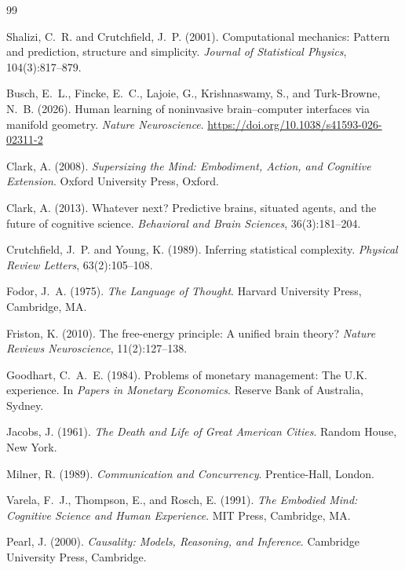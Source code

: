 \documentclass[12pt, a4paper]{article}
\theoremstyle{plain}
\theoremstyle{definition}
\theoremstyle{remark}
\begin{document}
\newpage

\begin{thebibliography}{99}

Shalizi, C.~R. and Crutchfield, J.~P. (2001). Computational mechanics:
Pattern and prediction, structure and simplicity. \textit{Journal of
Statistical Physics}, 104(3):817--879.

Busch, E.~L., Fincke, E.~C., Lajoie, G., Krishnaswamy, S., and
Turk-Browne, N.~B. (2026). Human learning of noninvasive brain--computer
interfaces via manifold geometry. \textit{Nature Neuroscience}.
\url{https://doi.org/10.1038/s41593-026-02311-2}

Clark, A. (2008). \textit{Supersizing the Mind: Embodiment, Action, and
Cognitive Extension}. Oxford University Press, Oxford.

Clark, A. (2013). Whatever next? Predictive brains, situated agents, and
the future of cognitive science. \textit{Behavioral and Brain Sciences},
36(3):181--204.

Crutchfield, J.~P. and Young, K. (1989). Inferring statistical complexity.
\textit{Physical Review Letters}, 63(2):105--108.

Fodor, J.~A. (1975). \textit{The Language of Thought}. Harvard University
Press, Cambridge, MA.

Friston, K. (2010). The free-energy principle: A unified brain theory?
\textit{Nature Reviews Neuroscience}, 11(2):127--138.

Goodhart, C.~A.~E. (1984). Problems of monetary management: The U.K.
experience. In \textit{Papers in Monetary Economics}. Reserve Bank of
Australia, Sydney.

Jacobs, J. (1961). \textit{The Death and Life of Great American Cities}.
Random House, New York.

Milner, R. (1989). \textit{Communication and Concurrency}. Prentice-Hall,
London.

Varela, F.~J., Thompson, E., and Rosch, E. (1991). \textit{The Embodied
Mind: Cognitive Science and Human Experience}. MIT Press, Cambridge, MA.

Pearl, J. (2000). \textit{Causality: Models, Reasoning, and Inference}.
Cambridge University Press, Cambridge.


\end{thebibliography}
\end{document}
